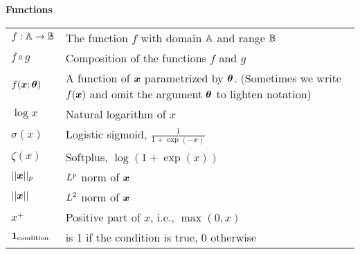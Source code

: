 \documentclass{article} %
\begin{document}
\centerline{\bf Functions}
\bgroup
\def\arraystretch{1.5}
\begin{tabular}{p{1.25in}p{3.25in}}
$\displaystyle f: {\mathbb{A}} \rightarrow {\mathbb{B}}$ & The function $f$ with domain ${\mathbb{A}}$ and range ${\mathbb{B}}$\\
$\displaystyle f \circ g $ & Composition of the functions $f$ and $g$ \\
$\displaystyle f({\bm{x}} ; {\bm{\theta}}) $ & A function of ${\bm{x}}$ parametrized by ${\bm{\theta}}$.
(Sometimes we write $f({\bm{x}})$ and omit the argument ${\bm{\theta}}$ to lighten notation) \\
$\displaystyle \log x$ & Natural logarithm of $x$ \\
$\displaystyle \sigma(x)$ & Logistic sigmoid, $\displaystyle \frac{1} {1 + \exp(-x)}$ \\
$\displaystyle \zeta(x)$ & Softplus, $\log(1 + \exp(x))$ \\
$\displaystyle || {\bm{x}} ||_p $ & $L^p$ norm of ${\bm{x}}$ \\
$\displaystyle || {\bm{x}} || $ & $L^2$ norm of ${\bm{x}}$ \\
$\displaystyle x^+$ & Positive part of $x$, i.e., $\max(0,x)$\\
$\displaystyle \bm{1}_\mathrm{condition}$ & is 1 if the condition is true, 0 otherwise\\
\end{tabular}
\egroup
\vspace{0.25cm}






\end{document}
